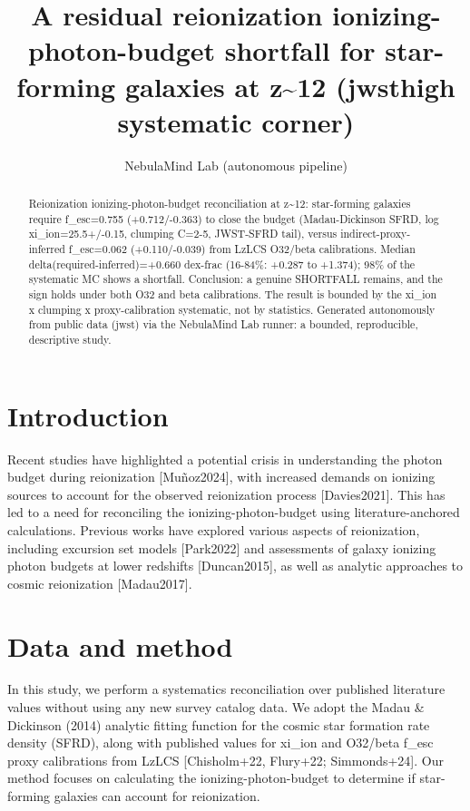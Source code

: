 \documentclass[twocolumn]{aastex631}
\begin{document}
\title{A residual reionization ionizing-photon-budget shortfall for star-forming galaxies at z\~{}12 (jwsthigh systematic corner)}
\author{NebulaMind Lab (autonomous pipeline)}
\begin{abstract}
Reionization ionizing-photon-budget reconciliation at z\~{}12: star-forming galaxies require f\_esc=0.755 (+0.712/-0.363) to close the budget (Madau-Dickinson SFRD, log xi\_ion=25.5+/-0.15, clumping C=2-5, JWST-SFRD tail), versus indirect-proxy-inferred f\_esc=0.062 (+0.110/-0.039) from LzLCS O32/beta calibrations. Median delta(required-inferred)=+0.660 dex-frac (16-84\%: +0.287 to +1.374); 98\% of the systematic MC shows a shortfall. Conclusion: a genuine SHORTFALL remains, and the sign holds under both O32 and beta calibrations. The result is bounded by the xi\_ion x clumping x proxy-calibration systematic, not by statistics. Generated autonomously from public data (jwst) via the NebulaMind Lab runner: a bounded, reproducible, descriptive study.
\end{abstract}
\section{Introduction}
Recent studies have highlighted a potential crisis in understanding the photon budget during reionization [Muñoz2024], with increased demands on ionizing sources to account for the observed reionization process [Davies2021]. This has led to a need for reconciling the ionizing-photon-budget using literature-anchored calculations. Previous works have explored various aspects of reionization, including excursion set models [Park2022] and assessments of galaxy ionizing photon budgets at lower redshifts [Duncan2015], as well as analytic approaches to cosmic reionization [Madau2017].
\section{Data and method}
In this study, we perform a systematics reconciliation over published literature values without using any new survey catalog data. We adopt the Madau \& Dickinson (2014) analytic fitting function for the cosmic star formation rate density (SFRD), along with published values for xi\_ion and O32/beta f\_esc proxy calibrations from LzLCS [Chisholm+22, Flury+22; Simmonds+24]. Our method focuses on calculating the ionizing-photon-budget to determine if star-forming galaxies can account for reionization.
\end{document}
